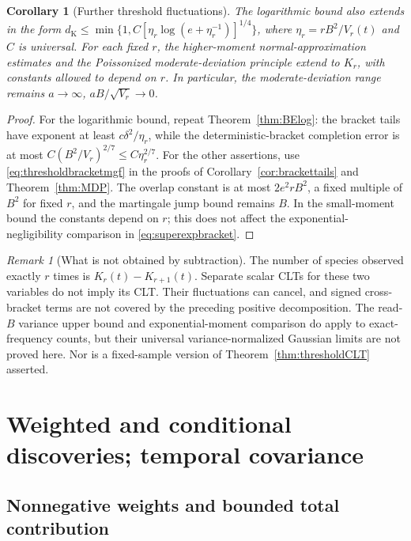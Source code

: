 \documentclass[11pt]{article}
\numberwithin{equation}{section}
\newtheorem{corollary}[theorem]{Corollary}
\theoremstyle{definition}
\theoremstyle{remark}
\newtheorem{remark}[theorem]{Remark}
\newcommand{\dK}{d_{\mathrm K}}
\begin{document}
\begin{corollary}[Further threshold fluctuations]\label{cor:thresholdMDP}
The logarithmic bound also extends in the form
$\dK\le\min\{1,C[\eta_r\log(e+\eta_r^{-1})]^{1/4}\}$, where
$\eta_r=rB^2/V_r(t)$ and $C$ is universal.
For each fixed $r$, the higher-moment normal-approximation estimates and the
Poissonized moderate-deviation principle extend to $K_r$, with constants
allowed to depend on $r$. In particular, the moderate-deviation range remains
$a\to\infty$, $aB/\sqrt{V_r}\to0$.
\end{corollary}
\begin{proof}
For the logarithmic bound, repeat Theorem~\ref{thm:BElog}: the bracket tails
have exponent at least $c\delta^2/\eta_r$, while the deterministic-bracket
completion error is at most $C(B^2/V_r)^{2/7}\le C\eta_r^{2/7}$.
For the other assertions, use \eqref{eq:thresholdbracketmgf} in the proofs of
Corollary~\ref{cor:brackettails} and Theorem~\ref{thm:MDP}. The overlap constant
is at most $2e^2rB^2$, a fixed multiple of $B^2$ for fixed $r$, and the martingale
jump bound remains $B$. In the small-moment bound the constants depend on $r$;
this does not affect the exponential-negligibility comparison in
\eqref{eq:superexpbracket}.
\end{proof}

\begin{remark}[What is not obtained by subtraction]
The number of species observed exactly $r$ times is
$K_r(t)-K_{r+1}(t)$. Separate scalar CLTs for these two variables do not imply
its CLT. Their fluctuations can cancel, and signed cross-bracket terms are not
covered by the preceding positive decomposition. The read-$B$ variance upper
bound and exponential-moment comparison do apply to exact-frequency counts,
but their universal variance-normalized Gaussian limits are not proved here.
Nor is a fixed-sample version of Theorem~\ref{thm:thresholdCLT} asserted.
\end{remark}

\section{Weighted and conditional discoveries; temporal covariance}\label{sec:extensions}

\subsection{Nonnegative weights and bounded total contribution}
\end{document}
